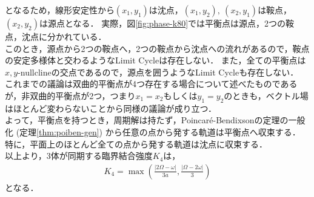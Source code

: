 \documentclass[../main]{subfiles}
\begin{document}
    となるため，線形安定性から$(x_1,y_1)$は沈点，$(x_1,y_2),\ (x_2,y_1)$は鞍点，$(x_2,y_2)$は源点となる．
    実際，図\ref{fig:phase-k80}では平衡点は源点，2つの鞍点，沈点に分かれている．\\
    このとき，源点から2つの鞍点へ，2つの鞍点から沈点への流れがあるので，鞍点の安定多様体と交わるようなLimit Cycleは存在しない．
    また，全ての平衡点は$x,y$-nullclineの交点であるので，源点を囲うようなLimit Cycleも存在しない．\\
    これまでの議論は双曲的平衡点が4つ存在する場合について述べたものであるが，非双曲的平衡点が2つ，つまり$x_1=x_2$もしくは$y_1=y_2$のときも，ベクトル場はほとんど変わらないことから同様の議論が成り立つ．\\
    よって，平衡点を持つとき，周期解は持たず，Poincar\'{e}-Bendixsonの定理の一般化 (定理\ref{thm:poiben-gen}) から任意の点から発する軌道は平衡点へ収束する．
    特に，平面上のほとんど全ての点から発する軌道は沈点に収束する．\\
    以上より，3体が同期する臨界結合強度$K_4$は，
    \begin{align*}
        K_4=\max\left(\frac{|2\Omega-\omega|}{3a},\frac{|\Omega-2\omega|}{3}\right)
    \end{align*}
    となる．
    
\end{document}
